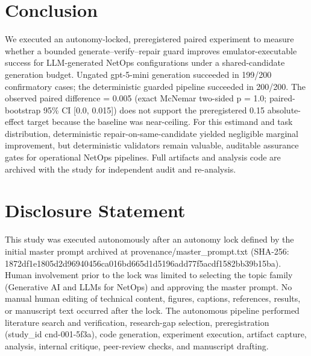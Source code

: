 \documentclass[conference]{IEEEtran}
\begin{document}
\section{Conclusion}
We executed an autonomy-locked, preregistered paired experiment to measure whether a bounded generate--verify--repair guard improves emulator-executable success for LLM-generated NetOps configurations under a shared-candidate generation budget. Ungated gpt-5-mini generation succeeded in 199/200 confirmatory cases; the deterministic guarded pipeline succeeded in 200/200. The observed paired difference = 0.005 (exact McNemar two-sided p = 1.0; paired-bootstrap 95\% CI [0.0, 0.015]) does not support the preregistered 0.15 absolute-effect target because the baseline was near-ceiling. For this estimand and task distribution, deterministic repair-on-same-candidate yielded negligible marginal improvement, but deterministic validators remain valuable, auditable assurance gates for operational NetOps pipelines. Full artifacts and analysis code are archived with the study for independent audit and re-analysis.

\section*{Disclosure Statement}
This study was executed autonomously after an autonomy lock defined by the initial master prompt archived at provenance/master\_prompt.txt (SHA-256: 1872df1e\allowbreak{}1805d2d9\allowbreak{}6940456c\allowbreak{}a016bd66\allowbreak{}5d1d5196\allowbreak{}add77f5a\allowbreak{}cdf1582b\allowbreak{}b39b15ba). Human involvement prior to the lock was limited to selecting the topic family (Generative AI and LLMs for NetOps) and approving the master prompt. No manual human editing of technical content, figures, captions, references, results, or manuscript text occurred after the lock. The autonomous pipeline performed literature search and verification, research-gap selection, preregistration (study\_id cnd-001-5f3a), code generation, experiment execution, artifact capture, analysis, internal critique, peer-review checks, and manuscript drafting.
\end{document}
